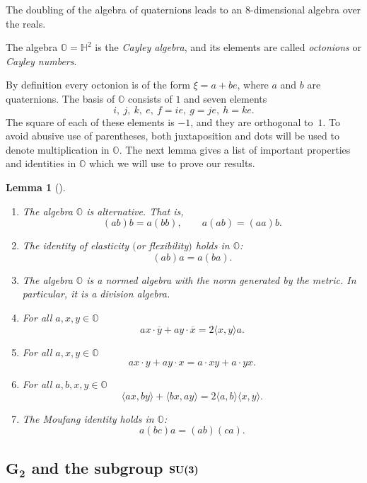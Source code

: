 \documentclass[pdftex]{sigma}
\numberwithin{equation}{section}
\newtheorem{Lemma}[Theorem]{Lemma}
\newcommand{\SH}{\mathbb{H}} %
\newcommand{\SO}{\mathbb{O}} %
\begin{document}
The doubling of the algebra of quaternions leads to an 8-dimensional algebra over the reals.
\begin{Definition} The algebra $\SO=\SH^2$ is the \textit{Cayley algebra}, and its elements are called \textit{octonions} or \textit{Cayley numbers}.
\end{Definition}
By definition every octonion is of the form $\xi=a+be$, where $a$ and $b$ are quaternions. The basis of $\SO$ consists of $1$ and seven elements
\[i,\ j,\ k,\ e,\ f=ie,\ g=je,\ h=ke .\]
The square of each of these elements is $-1$, and they are orthogonal to~$1$. To avoid abusive use of parentheses, both juxtaposition and dots will be used to denote multiplication in $\SO$. The next lemma gives a list of important properties and identities in $\SO$ which we will use to prove our results.

\begin{Lemma}[{\cite{postnikov1986lie}}]\label{lem:octprop}\quad
 \begin{enumerate}\itemsep=0pt
\item[$1.$] The algebra $\SO$ is alternative. That is,
 \[ (a b ) b=a (b b),\qquad a(a b)=(a a)b. \]
\item[$2.$] %
The identity of elasticity $($or flexibility$)$ holds in $\SO$:
 \[ (ab)a=a(ba). \]
\item[$3.$] The algebra $\SO$ is a normed algebra with the norm generated by the metric. In particular, it is a division algebra.
\item[$4.$] %
For all $a,x,y \in \SO$ \[ax\cdot\overline{y}+ay\cdot\overline{x}=2 \langle x,y \rangle a.\]
\item[$5.$] %
For all $a,x,y \in \SO$ \[ax\cdot y+ay\cdot x=a\cdot xy+a\cdot yx. \]
\item[$6.$] %
For all $a,b,x,y \in \SO$ \[ \langle ax,by\rangle+\langle bx,ay\rangle=2\langle a,b\rangle \langle x,y\rangle. \]
\item[$7.$] %
The Moufang identity holds in $\SO$: \[ a (bc) a= (ab)(ca). \]
 \end{enumerate}
\end{Lemma}

\subsection[$G_2$ and the subgroup ${\rm SU}(3)$]{$\boldsymbol{G_2}$ and the subgroup $\boldsymbol{{\rm SU}(3)}$}\label{section2.2}
\end{document}
